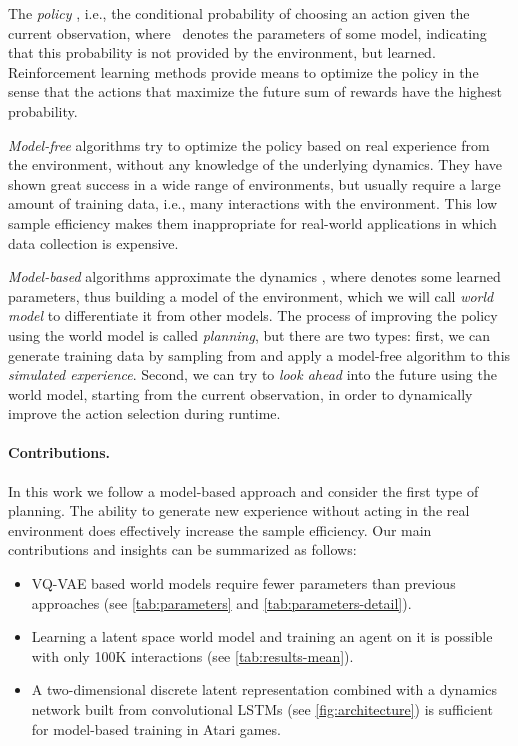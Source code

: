\documentclass{article}
\begin{document}
The \textit{policy} , i.e., the conditional probability
of choosing an action given the current observation, \mbox{where } denotes the
parameters of some model, indicating that this probability is not provided by
the environment, but learned. Reinforcement learning methods provide means to
optimize the policy in the sense that the actions that maximize the future sum
of rewards have the highest probability.

\textit{Model-free} algorithms try to optimize the policy
 based on real experience from the environment, without
any knowledge of the underlying dynamics. They have shown great success in a
wide range of environments, but usually require a large amount of training data,
i.e., many interactions with the environment. This low sample efficiency makes
them inappropriate for real-world applications in which data collection is
expensive.

\textit{Model-based} algorithms approximate the dynamics
,
where  denotes some learned parameters, thus building a model of the
environment, which we will call \textit{world model} to differentiate it from
other models. The process of improving the policy using the world model is
called \textit{planning}, but there are two types: first, we can generate
training data by sampling from  and apply a
model-free algorithm to this \textit{simulated experience}. Second, we can try
to \textit{look ahead} into the future using the world model, starting from the
current observation, in order to dynamically improve the action selection during
runtime.

\paragraph{Contributions.}
In this work we follow a model-based approach and consider the first type of
planning. The ability to generate new experience without acting in the real
environment does effectively increase the sample efficiency. Our main
contributions and insights can be summarized as follows:
\begin{itemize}
  \item VQ-VAE based world models require fewer parameters than previous
    approaches (see \cref{tab:parameters} and \cref{tab:parameters-detail}).
  \item Learning a latent space world model and training an agent on it is
    possible with only 100K interactions (see \cref{tab:results-mean}).
  \item A two-dimensional discrete latent representation combined with a
    dynamics network built from convolutional LSTMs (see
    \cref{fig:architecture}) is sufficient for model-based training in Atari
    games.
\end{itemize}
\end{document}
